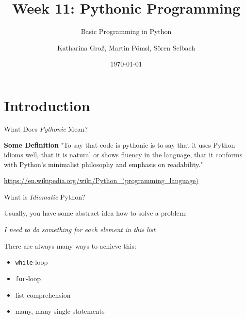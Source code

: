 



\title[Pythonic Programming]{Week 11: Pythonic Programming}
\subtitle{Basic Programming in Python}

\author[kgross, mpoemsl, sselbach]{Katharina Groß, Martin Pömsl, Sören Selbach}

\date{\today}

\begin{frame}[plain]
     \titlepage
\end{frame}

\begin{frame}
    \tableofcontents
\end{frame}

\section{Introduction}

\begin{frame}
    \sectionpage
\end{frame}


\begin{frame}{What Does {\it Pythonic} Mean?}

    \begin{exampleblock}{{\bf Some Definition}}
        "To say that code is pythonic is to say that it uses Python idioms well, that it is natural or shows fluency in the language, that it conforms with Python's minimalist philosophy and emphasis on readability."
    \end{exampleblock}

    \vspace{2em}

    \footnotesize{\url{https://en.wikipedia.org/wiki/Python_(programming_language)}}

\end{frame}


\begin{frame}{What is {\it Idiomatic} Python?}

    Usually, you have some abstract idea how to solve a problem:

    \vspace{1em}

    {\it I need to do something for each element in this list}

    \vspace{1em}

    There are always many ways to achieve this:

    \begin{itemize}
        \item {\tt while}-loop
        \item {\tt for}-loop
        \item list comprehension
        \item many, many single statements
    \end{itemize}

\end{frame}

